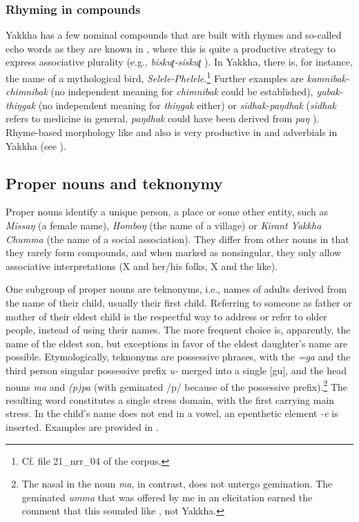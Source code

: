 \subsubsection{Rhyming in compounds}

 Yakkha has a few nominal compounds that are built with rhymes and so-called echo words as they are known in , where this is quite a productive strategy to express associative plurality (e.g., \emph{biskuʈ-siskuʈ} ). In Yakkha, there is, for instance, the  name of a mythological bird, \emph{Selele-Phelele}.\footnote{Cf. file 21\_nrr\_04 of the corpus.} Further examples are \emph{kamnibak-chimnibak}  (no independent meaning for \emph{chimnibak} could be  established), \emph{yubak-thiŋgak}  (no independent meaning for \emph{thiŋgak} either) or \emph{sidhak-paŋdhak}  (\emph{sidhak} refers to medicine in general, \emph{paŋdhak} could have been derived from \emph{paŋ} ). Rhyme-based morphology like   and also  is very productive in  and adverbials in Yakkha (see ).



\subsection{Proper nouns and teknonymy}
 
 Proper nouns identify a unique person, a place or some other entity, such as \emph{Missaŋ} (a female name), \emph{Homboŋ} (the name of a village) or \emph{Kirant Yakkha Chumma} (the name of a social association). They differ from other nouns in that they rarely form compounds, and when marked as nonsingular, they only allow associative interpretations (X and her/his folks, X and the like). 
 
 One subgroup of proper nouns are teknonyms, i.e., names of adults derived from the name of their child, usually their first child. Referring to someone as father or mother of their eldest child  is the respectful way to address or refer to older people, instead of using their names. The more frequent choice is, apparently, the name of the eldest son, but exceptions in favor of the eldest daughter's name are possible. Etymologically, teknonyms are possessive phrases, with the  \emph{=ga} and the third person singular possessive prefix \emph{u-} merged into a single  [gu], and the head nouns \emph{ma}  and \emph{(p)pa}  (with geminated /p/ because of  the possessive prefix).\footnote{The nasal in the noun \emph{ma}, in contrast, does not untergo gemination. The geminated \emph{umma} that was offered by me in an elicitation earned the comment that this sounded like , not Yakkha.} The resulting word constitutes a single stress domain, with the first  carrying main stress. In  the child's name does not end in a vowel, an epenthetic element \emph{-e} is inserted. Examples are provided in \Next. 

